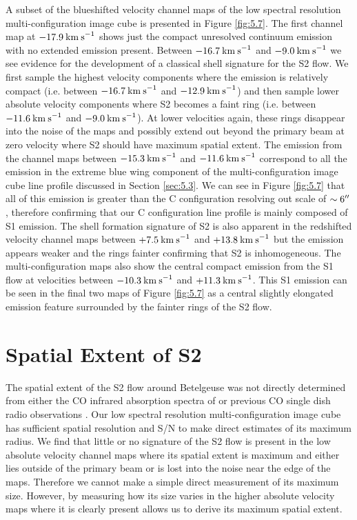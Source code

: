 A subset of the blueshifted velocity channel maps of the low spectral resolution multi-configuration image cube is presented in Figure \ref{fig:5.7}. The first channel map at $-17.9\>{\rm km\>s}^{-1}$ shows just the compact unresolved continuum emission with no extended emission present. Between $-16.7\>{\rm km\>s}^{-1}$ and $-9.0\>{\rm km\>s}^{-1}$ we see evidence for the development of a classical shell signature for the S2 flow. We first sample the highest velocity components where the emission is relatively compact (i.e. between $-16.7\>{\rm km\>s}^{-1}$ and $-12.9\>{\rm km\>s}^{-1}$) and then sample lower absolute velocity components where S2 becomes a faint ring (i.e. between $-11.6\>{\rm km\>s}^{-1}$ and $-9.0\>{\rm km\>s}^{-1}$). At lower velocities again, these rings disappear into the noise of the maps and possibly extend out beyond the primary beam at zero velocity where S2 should have maximum spatial extent. The emission from the channel maps between $-15.3\>{\rm km\>s}^{-1}$ and $-11.6\>{\rm km\>s}^{-1}$ correspond to all the emission in the extreme blue wing component of the multi-configuration image cube line profile discussed in Section \ref{sec:5.3}. We can see in Figure \ref{fig:5.7} that all of this emission is greater than the C configuration resolving out scale of $\sim 6^{\prime\prime}$, therefore confirming that our C configuration line profile is mainly composed of S1 emission. The shell formation signature of S2 is also apparent in the redshifted velocity channel maps between $+7.5\>{\rm km\>s}^{-1}$ and $+13.8\>{\rm km\>s}^{-1}$ but the emission appears weaker and the rings fainter confirming that S2 is inhomogeneous. The multi-configuration maps also show the central compact emission from the S1 flow at velocities between $-10.3\>{\rm km\>s}^{-1}$ and $+11.3\>{\rm km\>s}^{-1}$. This S1 emission can be seen in the final two maps of Figure \ref{fig:5.7} as a central slightly elongated emission feature surrounded by the fainter rings of the S2 flow. 

\section{Spatial Extent of S2}\label{sec:5.6}
The spatial extent of the S2 flow around Betelgeuse was not directly determined from either the CO infrared absorption spectra of \cite{bernat_1979} or previous CO single dish radio observations \citep{knapp_1980, huggins_1987, huggins_1994}. Our low spectral resolution multi-configuration image cube has sufficient spatial resolution and S/N to make direct estimates of its maximum radius. We find that little or no signature of the S2 flow is present in the low absolute velocity channel maps where its spatial extent is maximum and either lies outside of the primary beam or is lost into the noise near the edge of the maps. Therefore we cannot make a simple direct measurement of its maximum size. However, by measuring how its size varies in the higher absolute velocity maps where it is clearly present allows us to derive its maximum spatial extent. 

